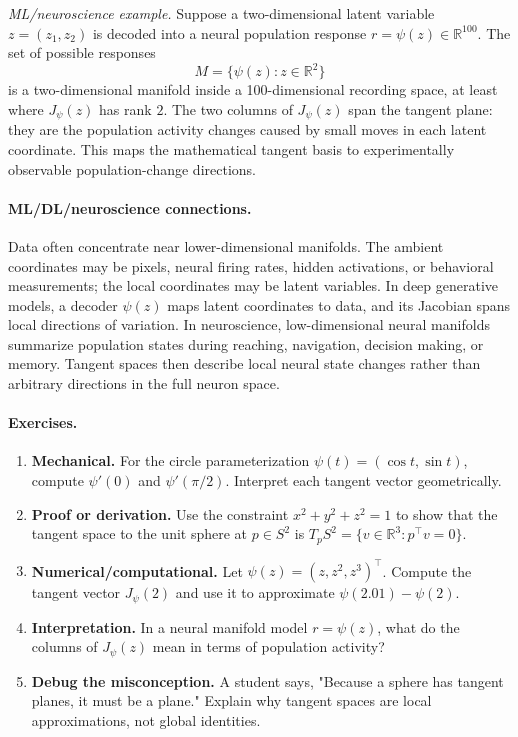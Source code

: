 \emph{ML/neuroscience example.} Suppose a two-dimensional latent variable \(z=(z_1,z_2)\) is decoded into a neural population response \(r=\psi(z)\in\mathbb{R}^{100}\). The set of possible responses
\[
M=\{\psi(z):z\in\mathbb{R}^2\}
\]
is a two-dimensional manifold inside a 100-dimensional recording space, at least where \(J_\psi(z)\) has rank \(2\). The two columns of \(J_\psi(z)\) span the tangent plane: they are the population activity changes caused by small moves in each latent coordinate. This maps the mathematical tangent basis to experimentally observable population-change directions.

\paragraph{ML/DL/neuroscience connections.}
Data often concentrate near lower-dimensional manifolds. The ambient coordinates may be pixels, neural firing rates, hidden activations, or behavioral measurements; the local coordinates may be latent variables. In deep generative models, a decoder \(\psi(z)\) maps latent coordinates to data, and its Jacobian spans local directions of variation. In neuroscience, low-dimensional neural manifolds summarize population states during reaching, navigation, decision making, or memory. Tangent spaces then describe local neural state changes rather than arbitrary directions in the full neuron space.

\paragraph{Exercises.}
\begin{enumerate}[label=\textbf{10.3.\arabic*.}, leftmargin=*]
\item \textbf{Mechanical.} For the circle parameterization \(\psi(t)=(\cos t,\sin t)\), compute \(\psi'(0)\) and \(\psi'(\pi/2)\). Interpret each tangent vector geometrically.
\item \textbf{Proof or derivation.} Use the constraint \(x^2+y^2+z^2=1\) to show that the tangent space to the unit sphere at \(p\in S^2\) is \(T_pS^2=\{v\in\mathbb{R}^3:p^\top v=0\}\).
\item \textbf{Numerical/computational.} Let \(\psi(z)=(z,z^2,z^3)^\top\). Compute the tangent vector \(J_\psi(2)\) and use it to approximate \(\psi(2.01)-\psi(2)\).
\item \textbf{Interpretation.} In a neural manifold model \(r=\psi(z)\), what do the columns of \(J_\psi(z)\) mean in terms of population activity?
\item \textbf{Debug the misconception.} A student says, "Because a sphere has tangent planes, it must be a plane." Explain why tangent spaces are local approximations, not global identities.
\end{enumerate}

